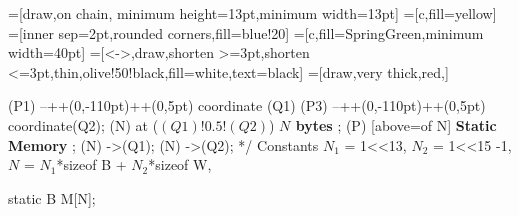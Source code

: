 \documentclass[12pt]{article}
\newenvironment{layout}{\quote
\tikzpicture[start chain=going right,x=20pt,y=14pt]
   \tikzset{pin distance=9pt}
   \tikzstyle{c}=[draw,on chain, minimum height=13pt,minimum width=13pt]
   \tikzstyle{a}=[c,fill=yellow]
   \tikzstyle{h}=[inner sep=2pt,rounded corners,fill=blue!20]
   \tikzstyle{p}=[c,fill=SpringGreen,minimum width=40pt]
   \tikzstyle{m}=[<->,draw,shorten >=3pt,shorten <=3pt,thin,olive!50!black,fill=white,text=black]
   \tikzstyle{u}=[draw,very thick,red,]
   \scriptsize%
}
{\endtikzpicture\endquote}
\begin{document}
\begin{code}[literate=
    {*}{$\times$}{1}
    {=}{$\equiv$ }{1}{*}{$\times$}{1}
    {1<<13}{$2^{13}$}{3}
    {1<<15}{$2^{15}$}{3}
    {1a<<$H_x$}{$2^{H_x}$}{3}
]
\begin{layout}
 (P1) --++(0,-110pt)++(0,5pt) coordinate (Q1) (P3) --++(0,-110pt)++(0,5pt) coordinate(Q2);
\node (N) at ($(Q1)!0.5!(Q2)$) {\tiny\bf $N$ bytes };
\node (P) [above=of N] {\bf\scriptsize Static Memory} ;
\draw[m]  (N) ->(Q1);
\draw[m] (N) ->(Q2);
\end{layout}
*/ 
Constants {
    $N_1$ = 1<<13,
    $N_2$ = 1<<15 -1,    
    $N$ = $N_1$*sizeof B + $N_2$*sizeof W,    
}

static B M[N]; 
\end{code}
\end{document}
